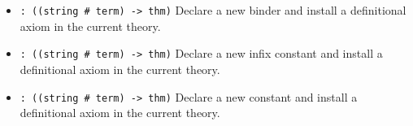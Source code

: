 \begin{itemize}
\item {} \verb|: ((string # term) -> thm)|\newline
Declare a new binder and install a definitional axiom in the current theory.

\item {} \verb|: ((string # term) -> thm)|\newline
Declare a new infix constant and install a definitional axiom in the current theory.

\item {} \verb|: ((string # term) -> thm)|\newline
Declare a new constant and install a definitional axiom in the current theory.
\end{itemize}


